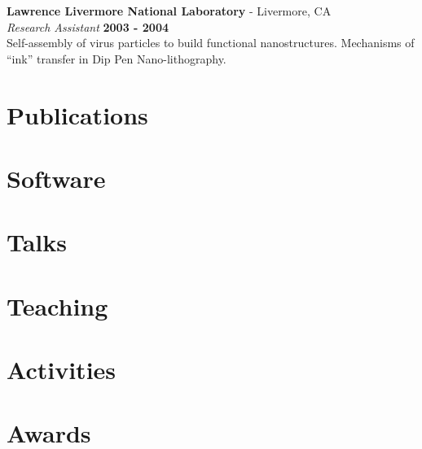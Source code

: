 \documentclass[margin,line]{res}
\begin{document}
\begin{resume}
{\bf Lawrence Livermore National Laboratory} - Livermore, CA\\
{\em Research Assistant} \hfill {\bf 2003 - 2004}\\
Self-assembly of virus particles to build functional nanostructures. Mechanisms of ``ink'' transfer in Dip Pen Nano-lithography.


\section{\sc Publications}




\section{\sc Software}



\section{\sc Talks}



\section{\sc Teaching}



\section{\sc Activities}




\section{\sc Awards}



\end{resume}
\end{document}
